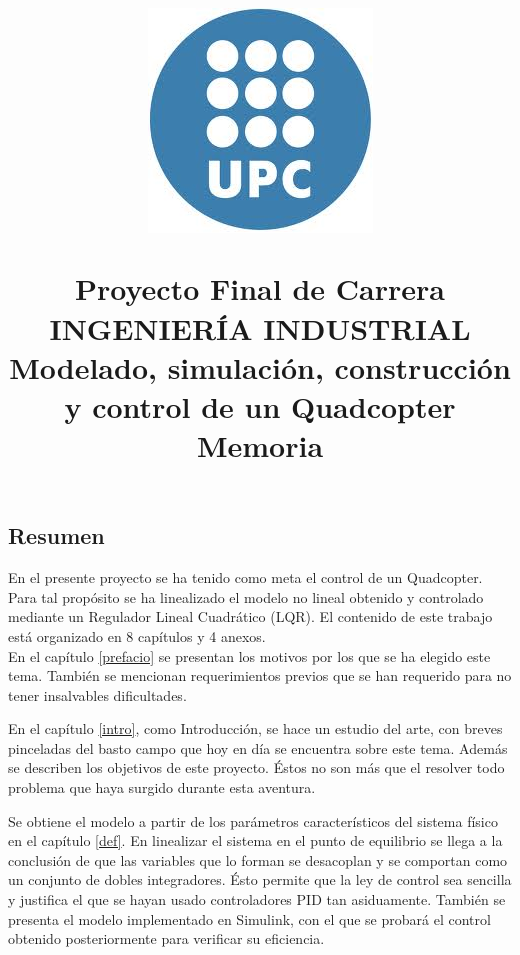 \documentclass[twoside,11pt]{book}
\title{\begin{center} 
\includegraphics[scale=0.4,bb=0 0 225 225]{images/upc.png} 
\end{center} 
\vspace{0cm} 
Proyecto Final de Carrera\\
INGENIERÍA INDUSTRIAL \\
\vspace{0cm} 
\Huge{Modelado, simulación, construcción y control de un Quadcopter} 
\vspace{0cm} \\ 
Memoria}
\date{}
\begin{document}
\onehalfspacing
\maketitle

\thispagestyle{empty}
\newpage
\begin{center}

\end{center}
\thispagestyle{empty}
\newpage
\setcounter{page}{1}

\begin{center}
\section*{Resumen}
\end{center}


En el presente proyecto se ha tenido como meta el control de un Quadcopter. Para tal propósito se ha linealizado  el modelo no lineal obtenido y controlado mediante un Regulador Lineal Cuadrático (LQR). El contenido de este trabajo está organizado en 8 capítulos y 4 anexos.\\

En el capítulo \ref{prefacio} se presentan los motivos por los que se ha elegido este tema. También se mencionan requerimientos previos que se han requerido para no tener insalvables dificultades. 

En el capítulo \ref{intro}, como Introducción, se hace un estudio del arte, con breves pinceladas del basto campo que hoy en día se encuentra sobre este tema. Además se describen los objetivos de este proyecto. Éstos no son más que el resolver todo problema que haya surgido durante esta aventura.

Se obtiene el modelo a partir de los parámetros característicos del sistema físico en el capítulo \ref{def}. En linealizar el sistema en el punto de equilibrio se llega a la conclusión de que las variables que lo forman se desacoplan y se comportan como un conjunto de dobles integradores. Ésto permite que la ley de control sea sencilla y justifica el que se hayan usado controladores PID tan asiduamente. También se presenta el modelo implementado en Simulink, con el que se probará el control obtenido posteriormente para verificar su eficiencia.
\end{document}
